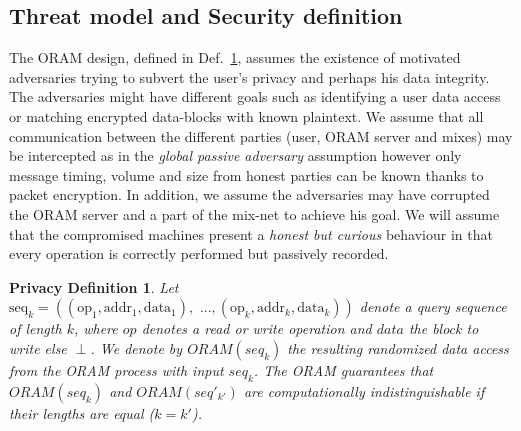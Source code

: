 \documentclass{llncs}
\newtheorem{privdef}{Privacy Definition}
\begin{document}
%
\subsection{Threat model and Security definition}\label{Threat}

The ORAM design, defined in Def.~\ref{def:Oram}, assumes the existence of motivated adversaries trying to subvert the user's privacy and perhaps his data integrity.
The adversaries might have different goals such as identifying a user data access or matching encrypted data-blocks with known plaintext. 
\noindent We assume that all communication between the different parties (user, ORAM server and mixes) may be intercepted as in the \textit{global passive adversary} assumption however only message timing, volume and size from honest parties can be known thanks to packet encryption.
In addition, we assume the adversaries may have corrupted the ORAM server and a part of the mix-net to achieve his goal.
We will assume that the compromised machines present a \textit{honest but curious} behaviour in that every operation is correctly performed but passively recorded.

\begin{privdef}\label{def:Oram}
Let $\text{seq}_k=((\text{op}_1, \text{addr}_1, \text{data}_1), \text{ ...},(\text{op}_k, \text{addr}_k, \text{data}_k))$ denote a query sequence of length $k$, where $op$ denotes a read or write operation and $data$ the block to write else $
\perp$.
We denote by $ORAM(seq_k)$ the resulting randomized data access from the ORAM process with input $seq_k$.
The ORAM guarantees that $ORAM(seq_k)$ and $ORAM(seq'_{k'})$ are computationally indistinguishable if their lengths are equal ($k=k'$).
\end{privdef}
\end{document}
